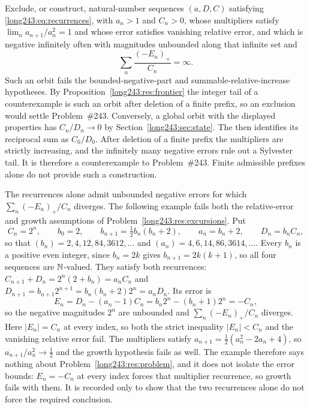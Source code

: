 \documentclass[11pt]{article}
\begin{document}
\begin{problem}\label{long243:res:excursions}
Exclude, or construct, natural-number sequences $(a,D,C)$ satisfying
\eqref{long243:eq:recurrences}, with $a_n>1$ and
$C_n>0$, whose multipliers satisfy $\lim_n a_{n+1}/a_n^{2}=1$ and whose error satisfies vanishing relative error, and which is
negative infinitely often with magnitudes unbounded along that infinite set and
\[
 \sum_n\frac{(-E_n)_+}{C_n}=\infty .
\]
Such an orbit fails the bounded-negative-part and summable-relative-increase
hypotheses.
By Proposition~\ref{long243:res:frontier} the integer tail of a counterexample is
such an orbit after deletion of a finite prefix, so an exclusion would settle
Problem~\#243. Conversely, a global orbit with the displayed properties
has $C_n/D_n\to0$ by Section~\ref{long243:sec:state}. The
 then identifies its reciprocal sum as $C_0/D_0$.
After deletion of a finite prefix the multipliers are strictly increasing,
and the infinitely many negative errors rule out a Sylvester tail.
It is therefore a counterexample to Problem~\#243. Finite admissible
prefixes alone do not provide such a construction.
\end{problem}

\begin{remark}\label{long243:rem:recurrence-without-relative-bound}
The recurrences alone admit unbounded negative errors for which
$\sum_n(-E_n)_+/C_n$ diverges. The following example fails both the
relative-error and growth assumptions of Problem~\ref{long243:res:excursions}. Put
\[
 C_n=2^{n},\qquad b_0=2,\qquad b_{n+1}=\tfrac12 b_n(b_n+2),\qquad
 a_n=b_n+2,\qquad D_n=b_nC_n ,
\]
so that $(b_n)=2,4,12,84,3612,\ldots$ and $(a_n)=4,6,14,86,3614,\ldots$.  Every
$b_n$ is a positive even integer, since $b_n=2k$ gives $b_{n+1}=2k(k+1)$, so all
four sequences are $\mathbb{N}$-valued. They satisfy both recurrences:
$C_{n+1}+D_n=2^{n}(2+b_n)=a_nC_n$ and
$D_{n+1}=b_{n+1}2^{n+1}=b_n(b_n+2)2^{n}=a_nD_n$.  Its error is
\[
 E_n=D_n-(a_n-1)C_n=b_n2^{n}-(b_n+1)2^{n}=-C_n ,
\]
so the negative magnitudes $2^{n}$ are unbounded and $\sum_n(-E_n)_+/C_n$
diverges. Here $|E_n|=C_n$ at every index, so both the strict inequality
$|E_n|<C_n$ and the vanishing relative error fail. The
multipliers satisfy $a_{n+1}=\tfrac12(a_n^{2}-2a_n+4)$, so
$a_{n+1}/a_n^{2}\to\tfrac12$ and the growth hypothesis fails as well.  The
example therefore says nothing about Problem~\ref{long243:res:problem}, and it does not
isolate the error bounds: $E_n=-C_n$ at every index forces that
multiplier recurrence, so growth fails with them.  It is recorded only to show
that the two recurrences alone do not force the required conclusion.
\end{remark}
\end{document}
